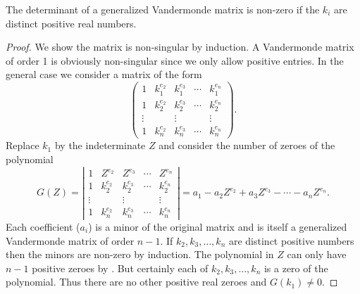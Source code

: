 \begin{proposition}
\label{Gen:Vandermonde:Prop}
The determinant of a generalized Vandermonde matrix is non-zero if the
$k_i$ are distinct positive real numbers.
\end{proposition}

\begin{proof}
We show the matrix is non-singular by induction.  A Vandermonde matrix
of order 1 is obviously non-singular since we only allow positive entries.
In the general case we consider a matrix of the form
\[
\begin{pmatrix}
1& k_1^{e_2} & k_1^{e_3} & \cdots & k_1^{e_n}\\
1& k_2^{e_2} & k_2^{e_3} & \cdots & k_2^{e_n}\\
\vdots& &\vdots & & \vdots\\
1& k_n^{e_2} & k_n^{e_3} & \cdots & k_n^{e_n}
\end{pmatrix}.
\]
Replace $k_1$ by the indeterminate $Z$ and consider the number of zeroes of
the polynomial
\[
G(Z) = 
\left|\begin{array}{ccccc}
  1& Z^{e_2} & Z^{e_3} & \cdots & Z^{e_n}\\
  1& k_2^{e_2} & k_2^{e_3} & \cdots & k_2^{e_n}\\
  \vdots& &\vdots & &\vdots\\
  1& k_n^{e_2} & k_n^{e_3} & \cdots & k_n^{e_n}
\end{array}\right| =
a_1 - a_2 Z^{e_2} + a_3 Z^{e_3} - \cdots - a_n Z^{e_n}.
\]
Each coefficient ($a_i$) is a minor of the original matrix and is itself a
generalized Vandermonde matrix of order $n-1$.  If $k_2, k_3, \ldots , k_n$
are distinct positive numbers then the minors are non-zero by induction.
The polynomial in $Z$ can only have $n-1$ positive zeroes by
.  But certainly each of $k_2, k_3, \ldots,
k_n$ is a zero of the polynomial.  Thus there are no other positive
real zeroes and $G(k_1) \not= 0$.
\end{proof}

